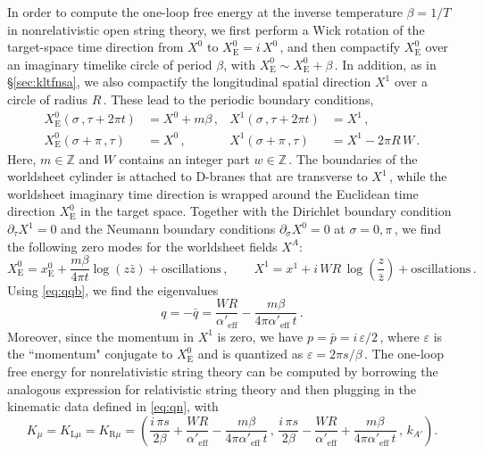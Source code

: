 \documentclass[11pt]{article}
\newcommand{\be}{\begin{equation}}
\newcommand{\ee}{\end{equation}}
\newcommand{\lr}{\left (}
\newcommand{\rr}{\right )}
\newcommand{\p}{\partial}
\begin{document}
In order to compute the one-loop free energy at the inverse temperature $\beta = 1 / T$ in nonrelativistic open string theory, we first perform a Wick rotation of the target-space time direction from $X^0$ to $X^0_\text{E} = i \, X^0$\,, and then compactify $X^0_\text{E}$ over an imaginary timelike circle of period $\beta$, with $X^0_\text{E} \sim X^0_\text{E} + \beta$\,. In addition, as in \S\ref{sec:kltfnsa}, we also compactify the longitudinal spatial direction $X^1$ over a circle of radius $R$\,. These lead to the periodic boundary conditions,
%
\begin{subequations}
\begin{align}
    X^0_\text{E} (\sigma\,, \tau+2\pi t) &= X^0 + m \beta\,,
        &%
    X^1(\sigma\,, \tau+2\pi t) &= X^1\,, \\[2pt]
    X^0_\text{E} (\sigma + \pi\,, \tau) &= X^0\,,
        &%
    X^1(\sigma + \pi\,, \tau) &= X^1 - 2 \pi R \, W\,.
\end{align}
\end{subequations}
%
Here, $m \in \mathbb{Z}$ and $W$ contains an integer part $w \in \mathbb{Z}$\,. The boundaries of the worldsheet cylinder is attached to D-branes that are transverse to $X^1$\,, while the worldsheet imaginary time direction is wrapped around the Euclidean time direction $X^0_\text{E}$ in the target space. Together with the Dirichlet boundary condition $\p_\tau X^1 = 0$ and the Neumann boundary conditions $\p_\sigma X^0 = 0$ at $\sigma = 0, \pi$\,, we find the following zero modes for the worldsheet fields $X^A$:
%
\be
    X^0_\text{E} = x^0_\text{E} + \frac{m \beta}{4\pi t} \log (z \bar{z}) + \text{oscillations}\,,
        \qquad%
    X^1 = x^1 + i\,W R \, \log\lr\frac{z}{\bar{z}}\rr + \text{oscillations}\,.
\ee
%
Using \eqref{eq:qqb}, we find the eigenvalues
%
\be
    q = - \bar{q} = \frac{W R}{\alpha'_\text{eff}} - \frac{m \beta}{4\pi \alpha'_\text{eff} \, t}\,.
\ee
%
Moreover, since the momentum in $X^1$ is zero, we have $p = \bar{p} = i \, \varepsilon/2$\,, where $\varepsilon$ is the ``momentum" conjugate to $X^0_\text{E}$ and is quantized as $\varepsilon = 2 \pi s / \beta$\,.
%
The one-loop free energy for nonrelativistic string theory can be computed by borrowing the analogous expression for relativistic string theory and then plugging in the kinematic data defined in \eqref{eq:qn}, with
%
\be \label{eq:kdfe}
    K_\mu = K_{\text{L}\mu} = K_{\text{R}\mu} = \lr \frac{i \, \pi s}{2 \beta} + \frac{WR}{\alpha'_\text{eff}} - \frac{m\beta}{4\pi\alpha'_\text{eff} \, t}\,,\, \frac{i \, \pi s}{2 \beta} - \frac{WR}{\alpha'_\text{eff}} + \frac{m\beta}{4\pi\alpha'_\text{eff} \, t}\,,\, k_{A'} \rr.
\ee
\end{document}
